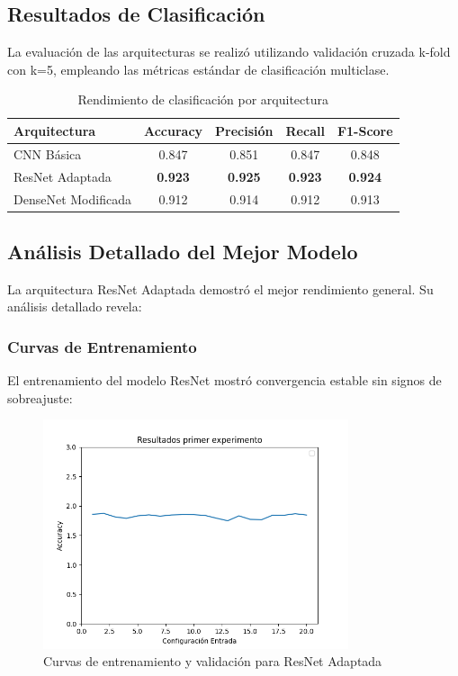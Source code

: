 \subsection{Resultados de Clasificación}

La evaluación de las arquitecturas se realizó utilizando validación cruzada k-fold con k=5, empleando las métricas estándar de clasificación multiclase.

\begin{table}[h!]
\centering
\caption{Rendimiento de clasificación por arquitectura}
\begin{tabular}{|l|c|c|c|c|}
\hline
\textbf{Arquitectura} & \textbf{Accuracy} & \textbf{Precisión} & \textbf{Recall} & \textbf{F1-Score} \\
\hline
CNN Básica & 0.847 & 0.851 & 0.847 & 0.848 \\
\hline
ResNet Adaptada & \textbf{0.923} & \textbf{0.925} & \textbf{0.923} & \textbf{0.924} \\
\hline
DenseNet Modificada & 0.912 & 0.914 & 0.912 & 0.913 \\
\hline
\end{tabular}
\label{tab:classification_results}
\end{table}

\subsection{Análisis Detallado del Mejor Modelo}

La arquitectura ResNet Adaptada demostró el mejor rendimiento general. Su análisis detallado revela:

\subsubsection{Curvas de Entrenamiento}

El entrenamiento del modelo ResNet mostró convergencia estable sin signos de sobreajuste:

\begin{figure}[h!]
\centering
\includegraphics[width=0.8\textwidth]{images/resultSecondEval.png}
\caption{Curvas de entrenamiento y validación para ResNet Adaptada}
\label{fig:training_curves}
\end{figure}


